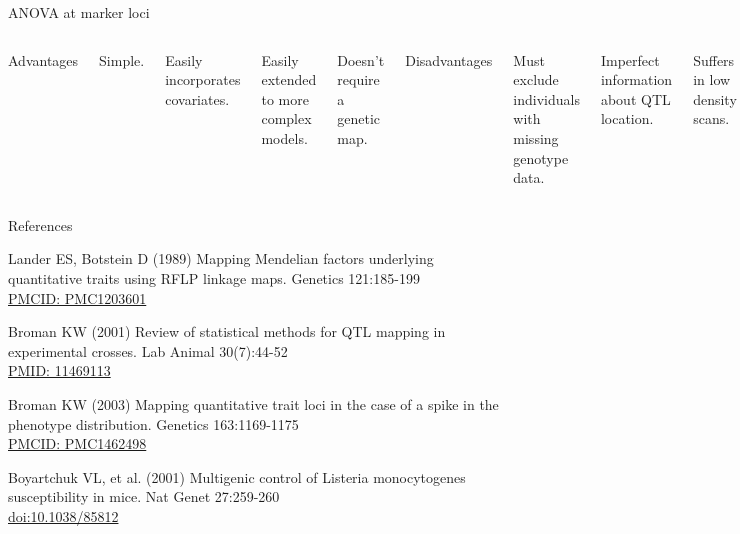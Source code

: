 \documentclass[aspectratio=169,12pt,t]{beamer}
\begin{document}
\begin{frame}{ANOVA at marker loci}

\begin{columns}

{\hilit Advantages}

\bi
\item Simple.
\item Easily incorporates covariates.
\item Easily extended to more complex models.
\item Doesn't require a genetic map.
\ei



{\hilit Disadvantages}

\bi
\item Must exclude individuals with missing genotype data.
\item Imperfect information about QTL location.
\item Suffers in low density scans.
\item {\vhilit Only considers one QTL at a time.}
\ei

\end{columns}

\end{frame}


\begin{frame}{References}
\vspace{-7mm}

  \bbi

\item Lander ES, Botstein D (1989) Mapping Mendelian factors
  underlying quantitative traits using RFLP linkage maps. Genetics
  121:185-199 \\
  \href{https://www.ncbi.nlm.nih.gov/pmc/articles/PMC1203601}{\footnotesize
    PMCID: PMC1203601}

\item Broman KW (2001) Review of statistical methods for QTL mapping
  in experimental crosses. Lab Animal 30(7):44-52 \\
  \href{https://www.ncbi.nlm.nih.gov/pubmed/11469113}{\footnotesize
    PMID: 11469113}

\item Broman KW (2003) Mapping quantitative trait loci in the case
  of a spike in the phenotype distribution. Genetics 163:1169-1175 \\
  \href{https://www.ncbi.nlm.nih.gov/pmc/articles/PMC1462498}{\footnotesize
    PMCID: PMC1462498}

\item Boyartchuk VL, et al. (2001) Multigenic control of Listeria monocytogenes
  susceptibility in mice. Nat Genet 27:259-260 \\
  \href{https://doi.org/10.1038/85812}{\footnotesize doi:10.1038/85812}

\ei


\end{frame}
\end{document}
